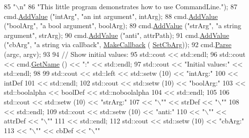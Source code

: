 \begin{DoxyCode}
85              \textcolor{stringliteral}{"\(\backslash\)n"}
86              \textcolor{stringliteral}{"This little program demonstrates how to use CommandLine."});
87   cmd.\hyperlink{classns3_1_1CommandLine_addcfb546c7ad4c8bd0965654d55beb8e}{AddValue} (\textcolor{stringliteral}{"intArg"},  \textcolor{stringliteral}{"an int argument"},       intArg);
88   cmd.\hyperlink{classns3_1_1CommandLine_addcfb546c7ad4c8bd0965654d55beb8e}{AddValue} (\textcolor{stringliteral}{"boolArg"}, \textcolor{stringliteral}{"a bool argument"},       boolArg);
89   cmd.\hyperlink{classns3_1_1CommandLine_addcfb546c7ad4c8bd0965654d55beb8e}{AddValue} (\textcolor{stringliteral}{"strArg"},  \textcolor{stringliteral}{"a string argument"},     strArg);
90   cmd.\hyperlink{classns3_1_1CommandLine_addcfb546c7ad4c8bd0965654d55beb8e}{AddValue} (\textcolor{stringliteral}{"anti"},    attrPath);
91   cmd.\hyperlink{classns3_1_1CommandLine_addcfb546c7ad4c8bd0965654d55beb8e}{AddValue} (\textcolor{stringliteral}{"cbArg"},   \textcolor{stringliteral}{"a string via callback"}, \hyperlink{group__makecallbackmemptr_ga9376283685aa99d204048d6a4b7610a4}{MakeCallback} (
      \hyperlink{command-line-example_8cc_adeee81f82b40e460fd3e5165bac7d91f}{SetCbArg}));
92   cmd.\hyperlink{classns3_1_1CommandLine_a5c10b85b3207e5ecb48d907966923156}{Parse} (argc, argv);
93 
94   \textcolor{comment}{// Show initial values:}
95   std::cout << std::endl;
96   std::cout << cmd.\hyperlink{classns3_1_1CommandLine_a114d7e6bddf575e40f7b62573a73c573}{GetName} () << \textcolor{stringliteral}{":"} << std::endl;
97   std::cout << \textcolor{stringliteral}{"Initial values:"} << std::endl;
98   
99   std::cout << std::left << std::setw (10) << \textcolor{stringliteral}{"intArg:"}
100             <<                    intDef
101             << std::endl;
102   std::cout << std::setw (10)              << \textcolor{stringliteral}{"boolArg:"}
103             << std::boolalpha  << boolDef  << std::noboolalpha
104             << std::endl;
105   
106   std::cout << std::setw (10)              << \textcolor{stringliteral}{"strArg:"}
107             << \textcolor{stringliteral}{"\(\backslash\)""}            << strDef   << \textcolor{stringliteral}{"\(\backslash\)""}
108             << std::endl;
109   std::cout << std::setw (10)              << \textcolor{stringliteral}{"anti:"}
110             << \textcolor{stringliteral}{"\(\backslash\)""}            << attrDef  << \textcolor{stringliteral}{"\(\backslash\)""}
111             << std::endl;
112   std::cout << std::setw (10)              << \textcolor{stringliteral}{"cbArg:"}
113             << \textcolor{stringliteral}{"\(\backslash\)""}            << cbDef    << \textcolor{stringliteral}{"\(\backslash\)""}

\end{DoxyCode}
